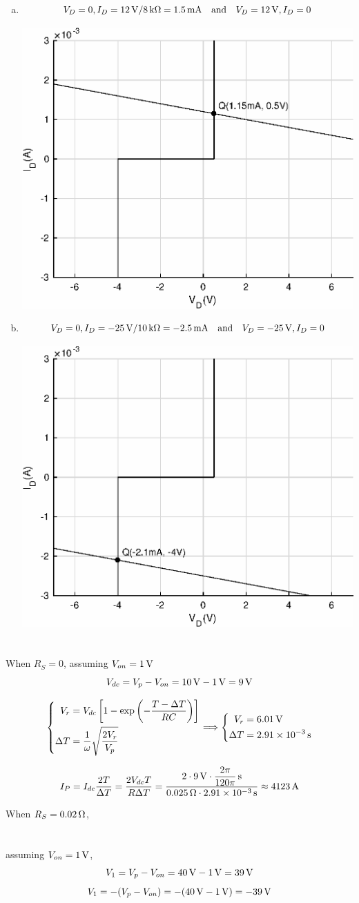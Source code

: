 \documentclass{article}
\newcommand{\unit}[1]{{\rm\,#1}}
\begin{document}
\begin{enumerate}[(a)]
\begin{center}
\end{center}
\item
$$V_D=0,I_D=12\unit{V}/8\unit{k\Omega}=1.5\unit{mA}{\rm\quad and\quad}V_D=12\unit{V},I_D=0$$
\begin{center}
\includegraphics[width=0.5\linewidth]{matlab/iv-7.eps}
\end{center}
\item
$$V_D=0,I_D=-25\unit{V}/10\unit{k\Omega}=-2.5\unit{mA}{\rm\quad and\quad}V_D=-25\unit{V},I_D=0$$
\begin{center}
\includegraphics[width=0.5\linewidth]{matlab/iv-8.eps}
\end{center}
\end{enumerate}

\section{}
When $R_S=0$, assuming $V_{on}=1\unit{V}$
$$V_{dc}=V_p-V_{on}=10\unit{V}-1\unit{V}=9\unit{V}$$

$$\left\{\begin{aligned}
V_r&=V_{dc}\left[1-\exp\left(-\frac{T-\Delta T}{RC}\right)\right]\\
\Delta T&=\frac{1}{\omega}\sqrt{\frac{2V_r}{V_p}}
\end{aligned}\right.\Longrightarrow\left\{\begin{aligned}
V_r&=6.01\unit{V}\\
\Delta T&=2.91\times10^{-3}\unit{s}
\end{aligned}\right.$$

$$I_P=I_{dc}\frac{2T}{\Delta T}=\frac{2V_{dc}T}{R\Delta T}=\frac{2\cdot9\unit{V}\cdot\dfrac{2\pi}{120\pi}\unit{s}}{0.025\unit{\Omega}\cdot2.91\times10^{-3}\unit{s}}\approx4123\unit{A}$$

When $R_S=0.02\unit{\Omega}$,

\section{}
assuming $V_{on}=1\unit{V}$,
$$V_1=V_p-V_{on}=40\unit{V}-1\unit{V}=39\unit{V}$$
$$V_1=-(V_p-V_{on})=-(40\unit{V}-1\unit{V})=-39\unit{V}$$
\end{document}

